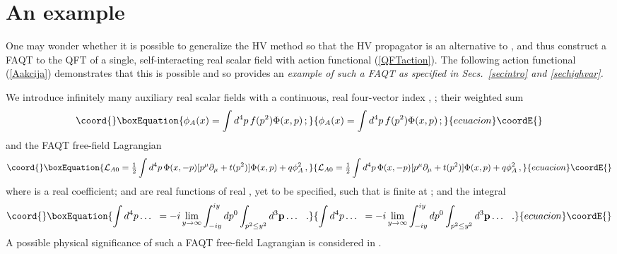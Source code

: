 \documentclass[a4paper,12pt]{article}
\providecommand{\half}{{\textstyle{1\over2}}}
\providecommand{\polje}{\phi}
\providecommand{\polA}{\polje_A}
\providecommand{\Polje}{\Phi}
\providecommand{\Lag}{{\cal L}}
\providecommand{\LagAf}{\Lag_{A0}}
\providecommand{\prop}{\widetilde{\Delta}}
\providecommand{\propF}{\prop_F}
\providecommand{\propR}{\prop_{HV}}
\begin{document}
\section{An example}
\label{secproof}

One may wonder whether it is possible to generalize the HV method so that the HV propagator \myHighlight{$\propR$}\coordHE{} is an alternative to \myHighlight{$\propF$}\coordHE{}, and thus construct a FAQT to the QFT of a single, self-interacting real scalar field with action functional (\ref{QFTaction}). The following action functional (\ref{Aakcija}) demonstrates that this is possible and so provides an \it example \rm of such a FAQT as specified in Secs.~\ref{secintro} and \ref{sechighvar}.

We introduce infinitely many auxiliary real scalar fields with a continuous, real four-vector index \coordHE{}, \myHighlight{$\Polje(x,p)$}\coordHE{}; their weighted sum
\begin{equation}\coord{}\boxEquation{
   \polA(x) = \int d^4p\, f(p^2) \Polje(x,p) \,;
   \label{tranpolje}
}{
   \polA(x) = \int d^4p\, f(p^2) \Polje(x,p) \,;
   }{ecuacion}\coordE{}\end{equation}
and the FAQT free-field Lagrangian 
\begin{equation}\coord{}\boxEquation{
   \LagAf =  \half \int d^4p\,\Polje(x,-p)[ p^\mu \partial_\mu + t(p^2) ] \Polje(x, p) + q \polA^2 \,,
   \label{AfreeLagr}
}{
   \LagAf =  \half \int d^4p\,\Polje(x,-p)[ p^\mu \partial_\mu + t(p^2) ] \Polje(x, p) + q \polA^2 \,,
   }{ecuacion}\coordE{}\end{equation}
where \coordHE{} is a real coefficient; \coordHE{} and \coordHE{} are real functions of real \coordHE{}, yet to be specified, such that \coordHE{} is finite at \coordHE{}; and the integral
\begin{equation}\coord{}\boxEquation{
   \int d^4p \dots \;\; = -i \lim_{y\to \infty} \int_{-iy}^{iy} dp^0 \int _{p^2 \le y^2} d^3{\bf  p} \dots \;\; \,.
   \label{traninte}
}{
   \int d^4p \dots \;\; = -i \lim_{y\to \infty} \int_{-iy}^{iy} dp^0 \int _{p^2 \le y^2} d^3{\bf  p} \dots \;\; \,.
   }{ecuacion}\coordE{}\end{equation}
A possible physical significance of such a FAQT free-field Lagrangian is considered in \cite{mi001}.
\end{document}
